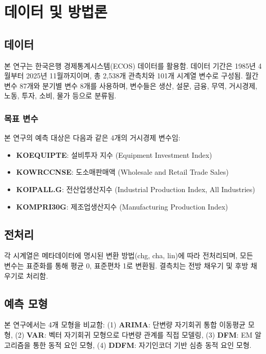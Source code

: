 \section{데이터 및 방법론}

\subsection{데이터}

본 연구는 한국은행 경제통계시스템(ECOS) 데이터를 활용함. 데이터 기간은 1985년 4월부터 2025년 11월까지이며, 총 2,538개 관측치와 101개 시계열 변수로 구성됨. 월간 변수 87개와 분기별 변수 8개를 사용하며, 변수들은 생산, 설문, 금융, 무역, 거시경제, 노동, 투자, 소비, 물가 등으로 분류됨.

\subsubsection{목표 변수}
본 연구의 예측 대상은 다음과 같은 4개의 거시경제 변수임:
\begin{itemize}
    \item \textbf{KOEQUIPTE}: 설비투자 지수 (Equipment Investment Index)
    \item \textbf{KOWRCCNSE}: 도소매판매액 (Wholesale and Retail Trade Sales)
    \item \textbf{KOIPALL.G}: 전산업생산지수 (Industrial Production Index, All Industries)
    \item \textbf{KOMPRI30G}: 제조업생산지수 (Manufacturing Production Index)
\end{itemize}

\subsection{전처리}

각 시계열은 메타데이터에 명시된 변환 방법(chg, cha, lin)에 따라 전처리되며, 모든 변수는 표준화를 통해 평균 0, 표준편차 1로 변환됨. 결측치는 전방 채우기 및 후방 채우기로 처리함.

\subsection{예측 모형}

본 연구에서는 4개 모형을 비교함: (1) \textbf{ARIMA}: 단변량 자기회귀 통합 이동평균 모형, (2) \textbf{VAR}: 벡터 자기회귀 모형으로 다변량 관계를 직접 모델링, (3) \textbf{DFM}: EM 알고리즘을 통한 동적 요인 모형, (4) \textbf{DDFM}: 자기인코더 기반 심층 동적 요인 모형.

